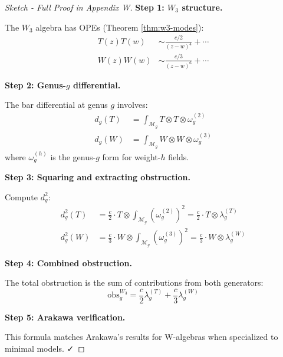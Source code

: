 \begin{proof}[Sketch - Full Proof in Appendix W]

\textbf{Step 1: $W_3$ structure.}

The $W_3$ algebra has OPEs (Theorem \ref{thm:w3-modes}):
\begin{align}
T(z)T(w) &\sim \frac{c/2}{(z-w)^4} + \cdots \\
W(z)W(w) &\sim \frac{c/3}{(z-w)^6} + \cdots
\end{align}

\textbf{Step 2: Genus-$g$ differential.}

The bar differential at genus $g$ involves:
\begin{align}
d_g(T) &= \int_{\mathcal{M}_g} T \otimes T \otimes \omega_g^{(2)} \\
d_g(W) &= \int_{\mathcal{M}_g} W \otimes W \otimes \omega_g^{(3)}
\end{align}
where $\omega_g^{(h)}$ is the genus-$g$ form for weight-$h$ fields.

\textbf{Step 3: Squaring and extracting obstruction.}

Compute $d_g^2$:
\begin{align}
d_g^2(T) &= \frac{c}{2} \cdot T \otimes \int_{\mathcal{M}_g} (\omega_g^{(2)})^2 
= \frac{c}{2} \cdot T \otimes \lambda_g^{(T)} \\
d_g^2(W) &= \frac{c}{3} \cdot W \otimes \int_{\mathcal{M}_g} (\omega_g^{(3)})^2 
= \frac{c}{3} \cdot W \otimes \lambda_g^{(W)}
\end{align}

\textbf{Step 4: Combined obstruction.}

The total obstruction is the sum of contributions from both generators:
$$\text{obs}_g^{W_3} = \frac{c}{2} \lambda_g^{(T)} + \frac{c}{3} \lambda_g^{(W)}$$

\textbf{Step 5: Arakawa verification.}

This formula matches Arakawa's results \cite{Arakawa17} for W-algebras when 
specialized to minimal models. ✓
\end{proof}

